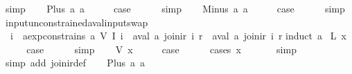 \begin{isabellebody}
\ simp\isanewline
{}\isamarkupfalse%
\isanewline
\ \ \isamarkupfalse%
\ {\isacharparenleft}Plus\ a{}\ a{}{\isacharparenright}\isanewline
\ \ \isamarkupfalse%
\ \isamarkupfalse%
\ {\isacharquery}case\isanewline
\ \ \ \ \isamarkupfalse%
\ simp\isanewline
{}\isamarkupfalse%
\isanewline
\ \ \isamarkupfalse%
\ {\isacharparenleft}Minus\ a{}\ a{}{\isacharparenright}\isanewline
\ \ \isamarkupfalse%
\ \isamarkupfalse%
\ {\isacharquery}case\isanewline
\ \ \ \ \isamarkupfalse%
\ simp\isanewline
{}\isamarkupfalse%
%
\endisatagproof
{\isafoldproof}%
%
\isadelimproof
\isanewline
%
\endisadelimproof
\isanewline
{}\isamarkupfalse%
\ input{\isacharunderscore}unconstrained{\isacharunderscore}aval{\isacharunderscore}input{\isacharunderscore}swap{\isacharcolon}\isanewline
\ \ {\isachardoublequoteopen}{\isasymforall}i{\isachardot}\ {\isasymnot}\ aexp{\isacharunderscore}constrains\ a\ {\isacharparenleft}V\ {\isacharparenleft}I\ i{\isacharparenright}{\isacharparenright}\ {\isasymLongrightarrow}\ aval\ a\ {\isacharparenleft}join{\isacharunderscore}ir\ i\ r{\isacharparenright}\ {\isacharequal}\ aval\ a\ {\isacharparenleft}join{\isacharunderscore}ir\ i{\isacharprime}\ r{\isacharparenright}{\isachardoublequoteclose}\isanewline
%
\isadelimproof
%
\endisadelimproof
%
\isatagproof
{}\isamarkupfalse%
{\isacharparenleft}induct\ a{\isacharparenright}\isanewline
{}\isamarkupfalse%
\ {\isacharparenleft}L\ x{\isacharparenright}\isanewline
\ \ \isamarkupfalse%
\ \isamarkupfalse%
\ {\isacharquery}case\isanewline
\ \ \ \ \isamarkupfalse%
\ simp\isanewline
{}\isamarkupfalse%
\isanewline
\ \ \isamarkupfalse%
\ {\isacharparenleft}V\ x{\isacharparenright}\isanewline
\ \ \isamarkupfalse%
\ \isamarkupfalse%
\ {\isacharquery}case\isanewline
\ \ \ \ \isamarkupfalse%
\ {\isacharparenleft}cases\ x{\isacharparenright}\isanewline
\ \ \ \ \ \isamarkupfalse%
\ simp\isanewline
\ \ \ \ \isamarkupfalse%
\ {\isacharparenleft}simp\ add{\isacharcolon}\ join{\isacharunderscore}ir{\isacharunderscore}def{\isacharparenright}\isanewline
{}\isamarkupfalse%
\isanewline
\ \ \isamarkupfalse%
\ {\isacharparenleft}Plus\ a{}\ a{}{\isacharparenright}\isanewline

\end{isabellebody}
